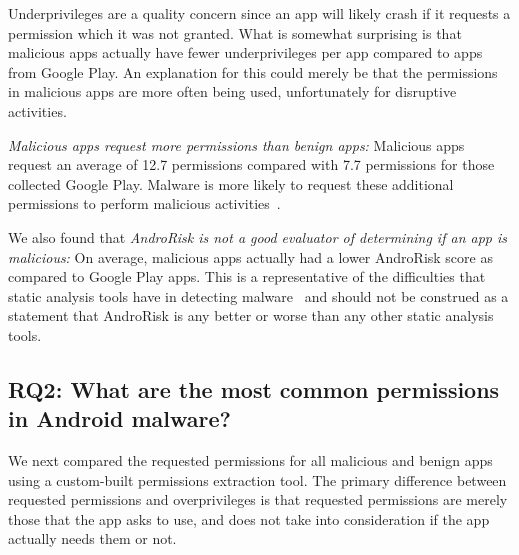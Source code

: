 \documentclass{sig-alternate}
\newcommand{\todo}[1]{\textcolor{cyan}{\textbf{[#1]}}}
\begin{document}
Underprivileges are a quality concern since an app will likely crash if it requests a permission which it was not granted. What is somewhat surprising is that malicious apps actually have fewer underprivileges per app compared to apps from Google Play. An explanation for this could merely be that the permissions in malicious apps are more often being used, unfortunately for disruptive activities.

\emph{Malicious apps request more permissions than benign apps:} Malicious apps request an average of 12.7 permissions compared with 7.7 permissions for those collected Google Play. Malware is more likely to request these additional permissions to perform malicious activities~\cite{Sarma:2012:APP:2295136.2295141}.


We also found that \emph{AndroRisk is not a good evaluator of determining if an app is malicious:} On average, malicious apps actually had a lower AndroRisk score as compared to Google Play apps. This is a representative of the difficulties that static analysis tools have in detecting malware~\cite{4413008, Feng:2014:ASD:2635868.2635869} and should not be construed as a statement that AndroRisk is any better or worse than any other static analysis tools.










\subsection{RQ2: What are the most common permissions in Android malware?}

We next compared the requested permissions for all malicious and benign apps using a custom-built permissions extraction tool. The primary difference between requested permissions and overprivileges is that requested permissions are merely those that the app asks to use, and does not take into consideration if the app actually needs them or not.
\end{document}
